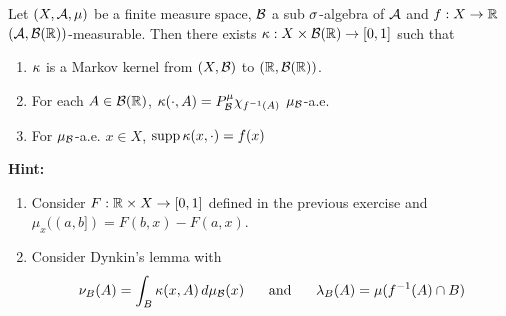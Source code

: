 \documentclass{book}
\begin{document}
	\begin{ex}
		Let $(X, \mathcal{A}, \mu)$ be a finite measure space, $\mathcal{B}$ a sub $\sigma$-algebra of $\mathcal{A}$ and $f: X \rightarrow \mathbb{R}$ $(\mathcal{A}, \mathcal{B}(\mathbb{R}))$-measurable. Then there exists $\kappa: X \times \mathcal{B}(\mathbb{R}) \rightarrow [0,1]$ such that 
		\begin{enumerate}
			\item $\kappa$ is a Markov kernel from $(X, \mathcal{B})$ to $(\mathbb{R}, \mathcal{B}(\mathbb{R}))$.
			\item For each $A \in \mathcal{B}(\mathbb{R})$, $\kappa(\cdot, A) = P^{\mu}_{\mathcal{B}}\chi_{f^{-1}(A)}$ $\mu_{\mathcal{B}}$-a.e.
			\item For $\mu_{\mathcal{B}}$-a.e. $x \in X$, $\operatorname{supp} \kappa(x, \cdot) = f(x)$
		\end{enumerate}
		\textbf{Hint:} 
		\begin{enumerate}
			\item Consider $F: \mathbb{R} \times X \rightarrow [0,1]$ defined in the previous exercise and $\mu_x((a,b]) = F(b,x) - F(a,x)$. 
			\item Consider Dynkin's lemma with $$\nu_B(A) = \int_B \kappa(x, A) \, d \mu_{\mathcal{B}}(x) \hspace{.5cm} \text{ and } \hspace{.5cm} \lambda_B(A) = \mu(f^{-1}(A) \cap B)$$
		\end{enumerate}
	\end{ex}
	
\end{document}
